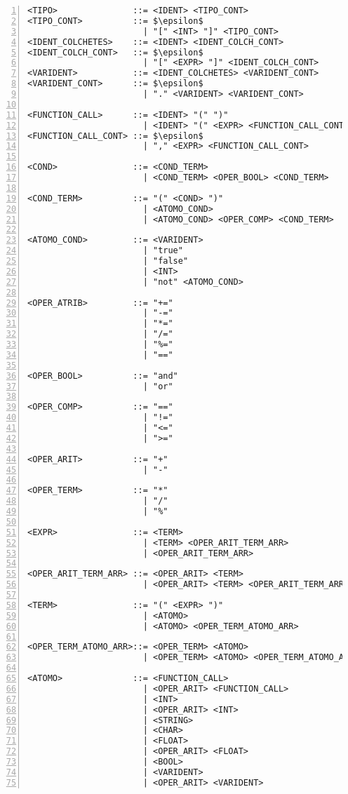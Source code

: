 \begin{lstlisting}[frame=single,numbers=left,breaklines=true,mathescape=true>]
<TIPO>               ::= <IDENT> <TIPO_CONT>
<TIPO_CONT>          ::= $\epsilon$
                       | "[" <INT> "]" <TIPO_CONT>
<IDENT_COLCHETES>    ::= <IDENT> <IDENT_COLCH_CONT>
<IDENT_COLCH_CONT>   ::= $\epsilon$
                       | "[" <EXPR> "]" <IDENT_COLCH_CONT>
<VARIDENT>           ::= <IDENT_COLCHETES> <VARIDENT_CONT>
<VARIDENT_CONT>      ::= $\epsilon$
                       | "." <VARIDENT> <VARIDENT_CONT>

<FUNCTION_CALL>      ::= <IDENT> "(" ")"
                       | <IDENT> "(" <EXPR> <FUNCTION_CALL_CONT> ")"
<FUNCTION_CALL_CONT> ::= $\epsilon$
                       | "," <EXPR> <FUNCTION_CALL_CONT>

<COND>               ::= <COND_TERM> 
                       | <COND_TERM> <OPER_BOOL> <COND_TERM>

<COND_TERM>          ::= "(" <COND> ")" 
                       | <ATOMO_COND> 
                       | <ATOMO_COND> <OPER_COMP> <COND_TERM>

<ATOMO_COND>         ::= <VARIDENT> 
                       | "true"
                       | "false"
                       | <INT> 
                       | "not" <ATOMO_COND>

<OPER_ATRIB>         ::= "+=" 
                       | "-=" 
                       | "*=" 
                       | "/=" 
                       | "%=" 
                       | "=="

<OPER_BOOL>          ::= "and" 
                       | "or"

<OPER_COMP>          ::= "==" 
                       | "!=" 
                       | "<=" 
                       | ">="

<OPER_ARIT>          ::= "+" 
                       | "-"

<OPER_TERM>          ::= "*" 
                       | "/" 
                       | "%"

<EXPR>               ::= <TERM> 
                       | <TERM> <OPER_ARIT_TERM_ARR>
                       | <OPER_ARIT_TERM_ARR>

<OPER_ARIT_TERM_ARR> ::= <OPER_ARIT> <TERM>
                       | <OPER_ARIT> <TERM> <OPER_ARIT_TERM_ARR>

<TERM>               ::= "(" <EXPR> ")"
                       | <ATOMO>
                       | <ATOMO> <OPER_TERM_ATOMO_ARR>

<OPER_TERM_ATOMO_ARR>::= <OPER_TERM> <ATOMO>
                       | <OPER_TERM> <ATOMO> <OPER_TERM_ATOMO_ARR>

<ATOMO>              ::= <FUNCTION_CALL>
                       | <OPER_ARIT> <FUNCTION_CALL>
                       | <INT>
                       | <OPER_ARIT> <INT>
                       | <STRING>
                       | <CHAR>
                       | <FLOAT>
                       | <OPER_ARIT> <FLOAT>
                       | <BOOL>
                       | <VARIDENT>
                       | <OPER_ARIT> <VARIDENT>
\end{lstlisting}
